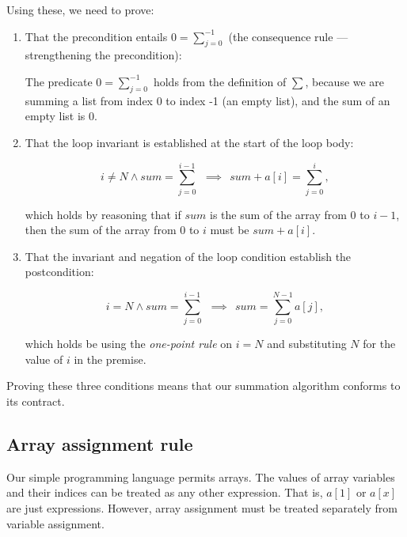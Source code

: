 \begin{example}
Using these, we need to prove:

\begin{enumerate}

 \item That the precondition entails $0 = \sum_{j=0}^{-1}$ (the consequence rule --- strengthening the precondition):

   The predicate $0 = \sum_{j=0}^{-1}$ holds from the definition of $\sum$, because we are summing a list from index 0 to index -1 (an empty list), and the sum of an empty list is 0.

 \item That the loop invariant is established at the start of the loop body:

 \begin{displaymath}
   i \neq N \land sum = \sum_{j=0}^{i - 1} ~~\implies~~ sum + a[i] = \sum_{j=0}^{i},
 \end{displaymath}
 
 which holds by reasoning that if $sum$ is the sum of the array from $0$ to $i-1$, then the sum of the array from $0$ to $i$ must be $sum + a[i]$.

 \item That the invariant and negation of the loop condition establish the postcondition:

 \begin{displaymath}
  i = N \land sum = \sum_{j=0}^{i - 1} ~~\implies~~ sum = \sum_{j=0}^{N - 1} a[j],
 \end{displaymath}

 which holds be using the \emph{one-point rule} on $i=N$ and substituting $N$ for the value of $i$ in the premise.

\end{enumerate}

Proving these three conditions  means that our summation algorithm conforms to its contract.

\end{example}


\subsection{Array assignment rule}

Our simple programming language permits arrays. The values of array variables and their indices can be treated as any other expression. That is, $a[1]$ or $a[x]$ are just expressions. However, array assignment must be treated separately from variable assignment.

